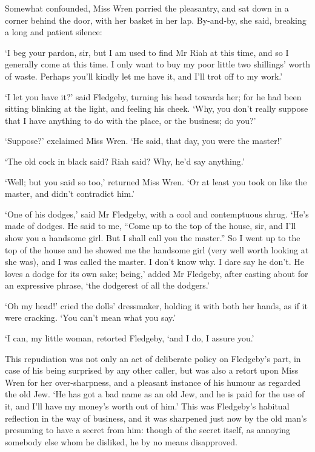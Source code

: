 Somewhat confounded, Miss Wren parried the pleasantry, and sat down in a
corner behind the door, with her basket in her lap. By-and-by, she said,
breaking a long and patient silence:

‘I beg your pardon, sir, but I am used to find Mr Riah at this time, and
so I generally come at this time. I only want to buy my poor little two
shillings’ worth of waste. Perhaps you’ll kindly let me have it, and
I’ll trot off to my work.’

‘I let you have it?’ said Fledgeby, turning his head towards her; for he
had been sitting blinking at the light, and feeling his cheek. ‘Why, you
don’t really suppose that I have anything to do with the place, or the
business; do you?’

‘Suppose?’ exclaimed Miss Wren. ‘He said, that day, you were the
master!’

‘The old cock in black said? Riah said? Why, he’d say anything.’

‘Well; but you said so too,’ returned Miss Wren. ‘Or at least you took
on like the master, and didn’t contradict him.’

‘One of his dodges,’ said Mr Fledgeby, with a cool and contemptuous
shrug. ‘He’s made of dodges. He said to me, “Come up to the top of the
house, sir, and I’ll show you a handsome girl. But I shall call you
the master.” So I went up to the top of the house and he showed me the
handsome girl (very well worth looking at she was), and I was called the
master. I don’t know why. I dare say he don’t. He loves a dodge for
its own sake; being,’ added Mr Fledgeby, after casting about for an
expressive phrase, ‘the dodgerest of all the dodgers.’

‘Oh my head!’ cried the dolls’ dressmaker, holding it with both her
hands, as if it were cracking. ‘You can’t mean what you say.’

‘I can, my little woman, retorted Fledgeby, ‘and I do, I assure you.’

This repudiation was not only an act of deliberate policy on Fledgeby’s
part, in case of his being surprised by any other caller, but was also a
retort upon Miss Wren for her over-sharpness, and a pleasant instance
of his humour as regarded the old Jew. ‘He has got a bad name as an old
Jew, and he is paid for the use of it, and I’ll have my money’s worth
out of him.’ This was Fledgeby’s habitual reflection in the way of
business, and it was sharpened just now by the old man’s presuming
to have a secret from him: though of the secret itself, as annoying
somebody else whom he disliked, he by no means disapproved.

